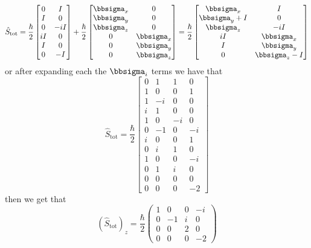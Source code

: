 \documentclass[12pt]{report}
\theoremstyle{custom}
\begin{document}
\begin{equation*}
  \hat{S}_{\text{tot}} = \frac{\hbar}{2} \begin{bmatrix} 
    0 & I \\ I & 0 \\ 0 & -i I \\iI & 0 \\ I & 0 \\ 0 & -I
    \end{bmatrix}  + \frac{\hbar}{2} \begin{bmatrix}
  \bbsigma_x & 0 \\ \bbsigma_y & 0 \\ \bbsigma_z & 0 \\ 0 & \bbsigma_x \\ 0 & \bbsigma_y \\ 0 & \bbsigma_z
\end{bmatrix} = \frac{\hbar}{2} \begin{bmatrix}
  \bbsigma_x & I \\ \bbsigma_y + I & 0 \\ \bbsigma_z & -iI \\ iI & \bbsigma_x \\ I & \bbsigma_y \\0 & \bbsigma_z - I
  \end{bmatrix}
\end{equation*}
or after expanding each the $\bbsigma_i$ terms we have that
\begin{equation*}
\hat{S}_{\text{tot}} = \frac{\hbar}{2} \begin{bmatrix}
 0 & 1 &1 & 0 \\
 1 & 0 & 0 & 1 \\
 1 & -i & 0 & 0 \\
 i & 1 & 0 & 0 \\
 1 & 0 & -i & 0 \\
 0 & -1 & 0 & -i \\
 i & 0 & 0 & 1 \\
 0 & i & 1 & 0 \\
 1 & 0 & 0 & -i \\
 0 & 1 & i & 0 \\
 0 & 0 & 0 & 0 \\
 0 & 0 & 0 & -2 
\end{bmatrix}
\end{equation*}
then we get that
\begin{equation*}
(\hat{S}_{\text{tot}})_z = \frac{\hbar}{2} \begin{pmatrix}1 & 0 & 0 & -i \\
  0 & -1 & i & 0 \\
  0 & 0 & 2 & 0 \\
  0 & 0 & 0 & -2
\end{pmatrix} 
\end{equation*}
\end{document}
